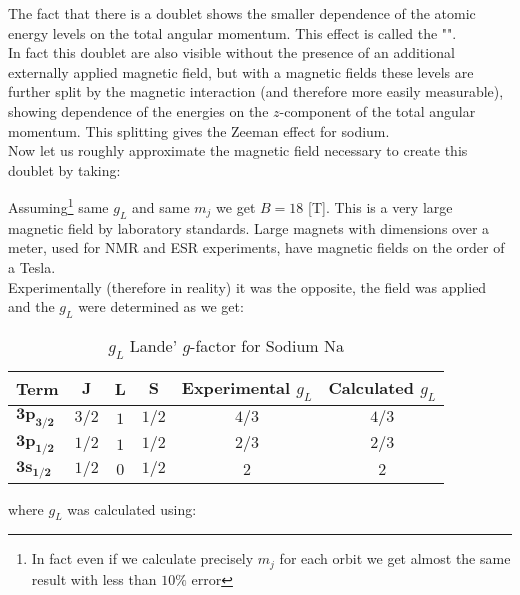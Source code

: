 	\begin{tcolorbox}[colframe=black,colback=white,sharp corners]
	The fact that there is a doublet shows the smaller dependence of the atomic energy levels on the total angular momentum. This effect is called the "".\\
	
	In fact this doublet are also visible without the presence of an additional externally applied magnetic field, but with a magnetic fields these levels are further split by the magnetic interaction (and therefore more easily measurable), showing dependence of the energies on the $z$-component of the total angular momentum. This splitting gives the Zeeman effect for sodium.\\
	
	Now let us roughly approximate the magnetic field necessary to create this doublet by taking:
	
	Assuming\footnote{In fact even if we calculate precisely $m_j$ for each orbit we get almost the same result with less than $10\%$ error} same $g_L$ and same $m_j$ we get $B=18$ [T]. This is a very large magnetic field by laboratory standards. Large magnets with dimensions over a meter, used for NMR and ESR experiments, have magnetic fields on the order of a Tesla.\\

	Experimentally (therefore in reality) it was the opposite, the field was applied and the $g_L$ were determined as we get:
	\begin{table}[H]
		\centering
		\begin{tabular}{|l|c|c|c|c|c|}
		\hline
		\rowcolor[HTML]{9B9B9B} 
		\textbf{Term} & \textbf{$\pmb{J}$} & \textbf{$\pmb{L}$} & \textbf{$\pmb{S}$} & Experimental \textbf{$g_L$} & Calculated \textbf{$g_L$}\\ \hline
		\cellcolor[HTML]{9B9B9B}\textbf{$\pmb{3p_{3/2}}$} & $3/2$ & $1$ & $1/2$ & $4/3$ & $4/3$ \\ \hline
		\cellcolor[HTML]{9B9B9B}\textbf{$\pmb{3p_{1/2}}$} & $1/2$ & $1$ & $1/2$ & $2/3$ & $2/3$\\ \hline
		\cellcolor[HTML]{9B9B9B}\textbf{$\pmb{3s_{1/2}}$} & $1/2$ & $0$ & $1/2$ & $2$ & $2$ \\ \hline
		\end{tabular}
		\caption{$g_L$ Lande' $g$-factor for Sodium $\mathrm{Na}$}
	\end{table}
	where $g_L$ was calculated using:
	
	\end{tcolorbox}
	
